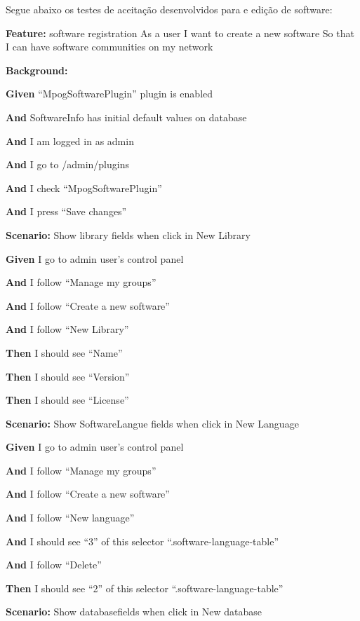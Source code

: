 Segue abaixo os testes de aceitação desenvolvidos para e edição de software:

\textbf{Feature:} software registration
  As a user
  I want to create a new software
  So that I can have software communities on my network

  \textbf{Background:}

    \textbf{Given} ``MpogSoftwarePlugin'' plugin is enabled
  
    \textbf{And} SoftwareInfo has initial default values on database
  
    \textbf{And} I am logged in as admin
  
    \textbf{And} I go to /admin/plugins
  
    \textbf{And} I check ``MpogSoftwarePlugin''
  
    \textbf{And} I press ``Save changes''

  \textbf{Scenario:} Show library fields when click in New Library
  
    \textbf{Given} I go to admin user's control panel
  
    \textbf{And} I follow ``Manage my groups''
  
    \textbf{And} I follow ``Create a new software''
  
    \textbf{And} I follow ``New Library''
  
    \textbf{Then} I should see ``Name''
  
    \textbf{Then} I should see ``Version''
  
    \textbf{Then} I should see ``License''

  
  \textbf{Scenario:} Show SoftwareLangue fields when click in New Language
  
    \textbf{Given} I go to admin user's control panel
  
    \textbf{And} I follow ``Manage my groups''
  
    \textbf{And} I follow ``Create a new software''
  
    \textbf{And} I follow ``New language''
  
    \textbf{And} I should see ``3'' of this selector ``.software-language-table''
  
    \textbf{And} I follow ``Delete''
  
    \textbf{Then} I should see ``2'' of this selector ``.software-language-table''
    

 
  \textbf{Scenario:} Show databasefields when click in New database
  
